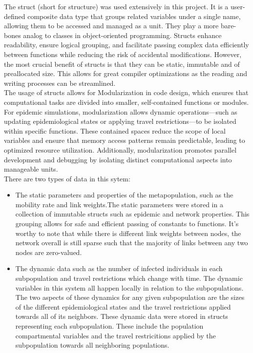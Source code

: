 The struct (short for structure) was used extensively in this project. It is a user-defined composite data type that groups related variables under a single name, allowing them to be accessed and managed as a unit. They play a more bare-bones analog to classes in object-oriented programming. Structs enhance readability, ensure logical grouping, and facilitate passing complex data efficiently between functions while reducing the risk of accidental modifications. However, the most crucial benefit of structs is that they can be static, immutable and of preallocated size. This allows for great compiler optimizations as the reading and writing processes can be streamlined.\\

The usage of structs allows for Modularization in code design, which ensures that computational tasks are divided into smaller, self-contained functions or modules. For epidemic simulations, modularization allows dynamic operations—such as updating epidemiological states or applying travel restrictions—to be isolated within specific functions. These contained spaces reduce the scope of local variables and ensure that memory access patterns remain predictable, leading to optimized resource utilization. Additionally, modularization promotes parallel development and debugging by isolating distinct computational aspects into manageable units.\\

There are two types of data in this sytem: 
\begin{itemize}
	\item The static parameters and properties of the metapopulation, such as the mobility rate and link weights.The static parameters were stored in a collection of immutable structs such as epidemic and network properties. This grouping allows for safe and efficient passing of constants to functions. It's worthy to note that while there is different link weights between nodes, the network overall is still sparse such that the majority of links between any two nodes are zero-valued.
	\item The dynamic data such as the number of infected individuals in each subpopulation and travel restrictions which change with time. The dynamic variables in this system all happen locally in relation to the subpopulations. The two aspects of these dynamics for any given subpopulation are the sizes of the different epidemiological states and the travel restrictions applied towards all of its neighbors. These dynamic data were stored in structs representing each subpopulation. These include the population compartmental variables and the travel restricitions applied by the subpopulation towards all neighboring populations.
\end{itemize}

